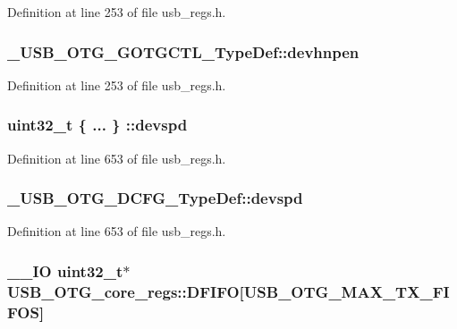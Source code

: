 Definition at line 253 of file usb\-\_\-regs.\-h.

\hypertarget{group___u_s_b___o_t_g___d_r_i_v_e_r_gac620352539abc5d73a05b0bbcde5d82b}{
\subsubsection[{devhnpen}]{ \-\_\-\-U\-S\-B\-\_\-\-O\-T\-G\-\_\-\-G\-O\-T\-G\-C\-T\-L\-\_\-\-Type\-Def\-::devhnpen}}\label{group___u_s_b___o_t_g___d_r_i_v_e_r_gac620352539abc5d73a05b0bbcde5d82b}


Definition at line 253 of file usb\-\_\-regs.\-h.

\hypertarget{group___u_s_b___o_t_g___d_r_i_v_e_r_gad51c1f67101488333711a169f6c0a0d6}{
\subsubsection[{devspd}]{\setlength{\rightskip}{0pt plus 5cm}uint32\-\_\-t \{ ... \} \-::devspd}}\label{group___u_s_b___o_t_g___d_r_i_v_e_r_gad51c1f67101488333711a169f6c0a0d6}


Definition at line 653 of file usb\-\_\-regs.\-h.

\hypertarget{group___u_s_b___o_t_g___d_r_i_v_e_r_ga478a9ce31a39e38fb2af42c4cd76916c}{
\subsubsection[{devspd}]{ \-\_\-\-U\-S\-B\-\_\-\-O\-T\-G\-\_\-\-D\-C\-F\-G\-\_\-\-Type\-Def\-::devspd}}\label{group___u_s_b___o_t_g___d_r_i_v_e_r_ga478a9ce31a39e38fb2af42c4cd76916c}


Definition at line 653 of file usb\-\_\-regs.\-h.

\hypertarget{group___u_s_b___o_t_g___d_r_i_v_e_r_ga0c14897a61771cef53ec091dfbb93694}{
\subsubsection[{D\-F\-I\-F\-O}]{\setlength{\rightskip}{0pt plus 5cm}\-\_\-\-\_\-\-I\-O {\bf uint32\-\_\-t}$\ast$ U\-S\-B\-\_\-\-O\-T\-G\-\_\-core\-\_\-regs\-::\-D\-F\-I\-F\-O\mbox{[}U\-S\-B\-\_\-\-O\-T\-G\-\_\-\-M\-A\-X\-\_\-\-T\-X\-\_\-\-F\-I\-F\-O\-S\mbox{]}}}\label{group___u_s_b___o_t_g___d_r_i_v_e_r_ga0c14897a61771cef53ec091dfbb93694}


